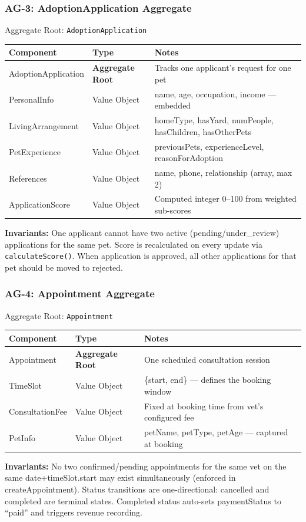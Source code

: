 \documentclass[12pt,a4paper]{article}
\begin{document}
\subsubsection{AG-3: AdoptionApplication Aggregate}

\begin{infobox}{Aggregate Root: \texttt{AdoptionApplication}}
\begin{tabular}{@{}p{3cm}p{2.8cm}p{7.8cm}@{}}
\textbf{Component} & \textbf{Type} & \textbf{Notes} \\
\hline
AdoptionApplication & \textbf{Aggregate Root} & Tracks one applicant's request for one pet \\
PersonalInfo & Value Object & name, age, occupation, income — embedded \\
LivingArrangement & Value Object & homeType, hasYard, numPeople, hasChildren, hasOtherPets \\
PetExperience & Value Object & previousPets, experienceLevel, reasonForAdoption \\
References & Value Object & name, phone, relationship (array, max 2) \\
ApplicationScore & Value Object & Computed integer 0--100 from weighted sub-scores \\
\end{tabular}

\textbf{Invariants:} One applicant cannot have two active (pending/under\_review) applications for the same pet. Score is recalculated on every update via \texttt{calculateScore()}. When application is approved, all other applications for that pet should be moved to rejected.
\end{infobox}

\subsubsection{AG-4: Appointment Aggregate}

\begin{infobox}{Aggregate Root: \texttt{Appointment}}
\begin{tabular}{@{}p{3cm}p{2.8cm}p{7.8cm}@{}}
\textbf{Component} & \textbf{Type} & \textbf{Notes} \\
\hline
Appointment & \textbf{Aggregate Root} & One scheduled consultation session \\
TimeSlot & Value Object & \{start, end\} — defines the booking window \\
ConsultationFee & Value Object & Fixed at booking time from vet's configured fee \\
PetInfo & Value Object & petName, petType, petAge — captured at booking \\
\end{tabular}

\textbf{Invariants:} No two confirmed/pending appointments for the same vet on the same date+timeSlot.start may exist simultaneously (enforced in createAppointment). Status transitions are one-directional: cancelled and completed are terminal states. Completed status auto-sets paymentStatus to ``paid'' and triggers revenue recording.
\end{infobox}
\end{document}
